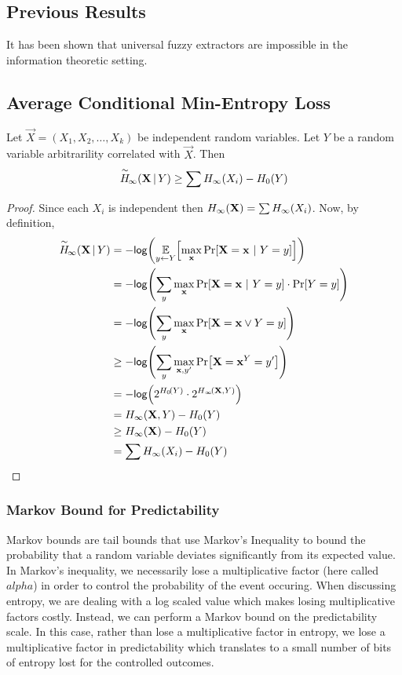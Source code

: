 \subsection{Previous Results}
It has been shown that universal fuzzy extractors are impossible in the information theoretic setting. 

\subsection{Average Conditional Min-Entropy Loss}
\begin{lemma}
    \label{lem:conditionalminentloss}
    Let $\vec{X} = (X_1, X_2, \ldots, X_k)$ be independent random variables. 
    Let $Y$ be a random variable arbitrarility correlated with $\vec{X}$. 
    Then 
    \[
        \overset{\sim}{H}\!_{\infty}\!\left(\mathbf{X}\,|\,Y\right) \geq \sum H_{\infty}\!\left(X_i\right) - H_0\!\left(Y\right)
    \]
\end{lemma} 

\begin{proof}
    Since each $X_i$ is independent then $H_{\infty}\!\left(\mathbf{X}\right) = \sum H_{\infty}\!\left(X_i\right)$.
    Now, by definition,
    \begin{align*}
        \acminent{\vec{X}}{Y} &= -\log{\Exlim{y \leftarrow Y}{\max\limits_{\vec{x}} \Prob{\Vec{X} = \vec{x}\ |\ Y = y}}} \\
        &= -\log{\sum\limits_{y} \max\limits_{\vec{x}} \Prob{\vec{X} = \vec{x} \ |\ Y = y} \cdot \Prob{Y = y}}\\
        &= -\log{\sum\limits_{y} \max\limits_{\vec{x}} \Prob{\vec{X} = \vec{x} \vee Y = y}}\\
        &\geq -\log{\sum\limits_{y} \max\limits_{\vec{x}, y'} \Prob{\vec{X} = \vec{x}  ^ Y = y'}}\\
        &= -\log{2^{\hart{Y}} \cdot 2^{\minent{\vec{X},Y}}}\\
        &= \minent{\vec{X},Y} - \hart{Y}\\
        &\geq \minent{\vec{X}} - \hart{Y} \\   
        &= \sum \minent{X_i} - \hart{Y}
    \end{align*}
\end{proof}

\subsubsection{Markov Bound for Predictability}
Markov bounds are tail bounds that use Markov's Inequality to bound the probability that a random variable deviates significantly from its expected value. In Markov's inequality, we necessarily lose a multiplicative factor (here called $alpha$) in order to control the probability of the event occuring. When discussing entropy, we are dealing with a log scaled value which makes losing multiplicative factors costly. Instead, we can perform a Markov bound on the predictability scale. In this case, rather than lose a multiplicative factor in entropy, we lose a multiplicative factor in predictability which translates to a small number of bits of entropy lost for the controlled outcomes.

